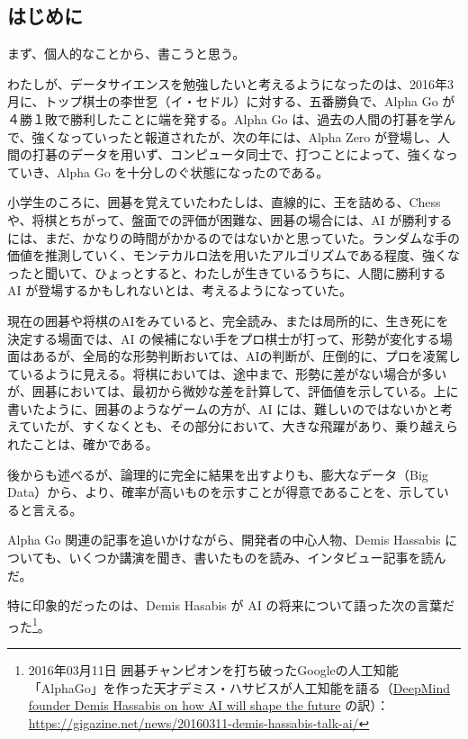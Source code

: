 \documentclass[
]{bxjsbook}
\theoremstyle{definition}
\theoremstyle{definition}
\theoremstyle{definition}
\theoremstyle{definition}
\theoremstyle{remark}
\begin{document}
\hypertarget{ux306fux3058ux3081ux306b-3}{%
\subsection{はじめに}\label{ux306fux3058ux3081ux306b-3}}

まず、個人的なことから、書こうと思う。

わたしが、データサイエンスを勉強したいと考えるようになったのは、2016年3月に、トップ棋士の李世乭（イ・セドル）に対する、五番勝負で、Alpha Go が ４勝１敗で勝利したことに端を発する。Alpha Go は、過去の人間の打碁を学んで、強くなっていったと報道されたが、次の年には、Alpha Zero が登場し、人間の打碁のデータを用いず、コンピュータ同士で、打つことによって、強くなっていき、Alpha Go を十分しのぐ状態になったのである。

小学生のころに、囲碁を覚えていたわたしは、直線的に、王を詰める、Chess や、将棋とちがって、盤面での評価が困難な、囲碁の場合には、AI が勝利するには、まだ、かなりの時間がかかるのではないかと思っていた。ランダムな手の価値を推測していく、モンテカルロ法を用いたアルゴリズムである程度、強くなったと聞いて、ひょっとすると、わたしが生きているうちに、人間に勝利する AI が登場するかもしれないとは、考えるようになっていた。

現在の囲碁や将棋のAIをみていると、完全読み、または局所的に、生き死にを決定する場面では、AI の候補にない手をプロ棋士が打って、形勢が変化する場面はあるが、全局的な形勢判断おいては、AIの判断が、圧倒的に、プロを凌駕しているように見える。将棋においては、途中まで、形勢に差がない場合が多いが、囲碁においては、最初から微妙な差を計算して、評価値を示している。上に書いたように、囲碁のようなゲームの方が、AI には、難しいのではないかと考えていたが、すくなくとも、その部分において、大きな飛躍があり、乗り越えられたことは、確かである。

後からも述べるが、論理的に完全に結果を出すよりも、膨大なデータ（Big Data）から、より、確率が高いものを示すことが得意であることを、示していると言える。

Alpha Go 関連の記事を追いかけながら、開発者の中心人物、Demis Hassabis についても、いくつか講演を聞き、書いたものを読み、インタビュー記事を読んだ。

特に印象的だったのは、Demis Hasabis が AI の将来について語った次の言葉だった\footnote{2016年03月11日 囲碁チャンピオンを打ち破ったGoogleの人工知能「AlphaGo」を作った天才デミス・ハサビスが人工知能を語る（\href{https://www.theverge.com/2016/3/10/11192774/demis-hassabis-interview-alphago-google-deepmind-ai}{DeepMind founder Demis Hassabis on how AI will shape the future} の訳）：\url{https://gigazine.net/news/20160311-demis-hassabis-talk-ai/}}。
\end{document}
